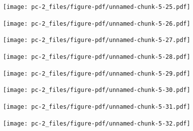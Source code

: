 \documentclass[
  letterpaper,
  DIV=11,
  numbers=noendperiod]{scrreprt}
\begin{document}
\begin{figure}[H]

{\centering \texttt{[image: pc-2\_files/figure-pdf/unnamed-chunk-5-25.pdf]}

}

\end{figure}

\begin{figure}[H]

{\centering \texttt{[image: pc-2\_files/figure-pdf/unnamed-chunk-5-26.pdf]}

}

\end{figure}

\begin{figure}[H]

{\centering \texttt{[image: pc-2\_files/figure-pdf/unnamed-chunk-5-27.pdf]}

}

\end{figure}

\begin{figure}[H]

{\centering \texttt{[image: pc-2\_files/figure-pdf/unnamed-chunk-5-28.pdf]}

}

\end{figure}

\begin{figure}[H]

{\centering \texttt{[image: pc-2\_files/figure-pdf/unnamed-chunk-5-29.pdf]}

}

\end{figure}

\begin{figure}[H]

{\centering \texttt{[image: pc-2\_files/figure-pdf/unnamed-chunk-5-30.pdf]}

}

\end{figure}

\begin{figure}[H]

{\centering \texttt{[image: pc-2\_files/figure-pdf/unnamed-chunk-5-31.pdf]}

}

\end{figure}

\begin{figure}[H]

{\centering \texttt{[image: pc-2\_files/figure-pdf/unnamed-chunk-5-32.pdf]}

}

\end{figure}
\end{document}
